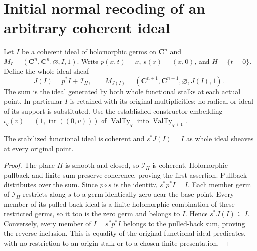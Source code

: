 \section{Initial normal recoding of an arbitrary coherent ideal}

\begin{definition}
\label{hir:disjoint-coherent-normal-record}
\leanok
Let $I$ be a coherent ideal of holomorphic germs on $\mathbf C^n$ and
$M_I=(\mathbf C^n,\mathbf C^n,\varnothing,I,1)$. Write $p(x,t)=x$,
$s(x)=(x,0)$, and $H=\{t=0\}$. Define the whole ideal sheaf
\[
 J(I)=p^*I+\mathcal I_H,
 \qquad M_{J(I)}=(\mathbf C^{n+1},\mathbf C^{n+1},\varnothing,J(I),1).
\]
The sum is the ideal generated by both whole functional stalks at each
actual point. In particular $I$ is retained with its original multiplicities;
no radical or ideal of its support is substituted. Use the established
constructor embedding $\iota_q(v)=(1,\operatorname{inr}((0,v)))$ of
$\operatorname{ValTy}_q$ into $\operatorname{ValTy}_{q+1}$.
\end{definition}

\begin{lemma}
\label{hir:disjoint-coherent-normal-whole-trace}
\leanok
The stabilized functional ideal is coherent and $s^*J(I)=I$ as whole ideal
sheaves at every original point.
\end{lemma}
\begin{proof}
The plane $H$ is smooth and closed, so $\mathcal I_H$ is coherent. Holomorphic
pullback and finite sum preserve coherence, proving the first assertion.
Pullback distributes over the sum. Since $p\circ s$ is the identity,
$s^*p^*I=I$. Each member germ of $\mathcal I_H$ restricts along $s$ to a germ
identically zero near the base point. Every member of its pulled-back ideal
is a finite holomorphic combination of these restricted germs, so it too
is the zero germ and belongs to $I$. Hence $s^*J(I)\subseteq I$. Conversely,
every member of $I=s^*p^*I$ belongs to the pulled-back sum, proving the reverse
inclusion. This is equality of the original functional ideal predicates,
with no restriction to an origin stalk or to a chosen finite presentation.
\end{proof}

